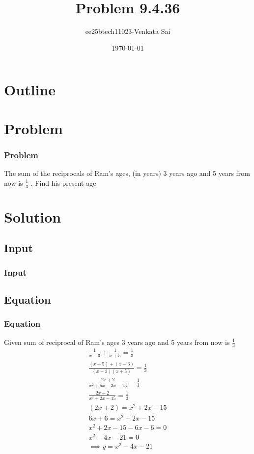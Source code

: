 \documentclass{beamer}
\title{Problem 9.4.36}
\author{ee25btech11023-Venkata Sai}
\date{\today}
\providecommand{\brak}[1]{\ensuremath{\left(#1\right)}}
\theoremstyle{remark}
\numberwithin{equation}{section}
\begin{document}
\begin{frame}
\titlepage
\end{frame}

\section*{Outline}
\begin{frame}
\tableofcontents
\end{frame}

\section{Problem}

\begin{frame}
\frametitle{Problem}
The sum of the reciprocals of Ram's ages, (in years) 3 years ago and 5 years from
now is $\frac{1}{3}$ . Find his present age
\end{frame}
\section{Solution}

\subsection{Input}
\setcounter{section}{1}
\begin{frame}
\frametitle{Input}
 
\end{frame}
\subsection{Equation}
\begin{frame}
\frametitle{Equation}
Given sum of reciprocal of Ram's ages 3 years ago and 5 years from
now is $\frac{1}{3}$
\begin{align}
\frac{1}{x-3}+\frac{1}{x+5}=\frac{1}{3} \\
\frac{\brak{x+5}+\brak{x-3}}{\brak{x-3}\brak{x+5}}=\frac{1}{3} \\
\frac{2x+2}{x^2+5x-3x-15}=\frac{1}{3}\\
\frac{2x+2}{x^2+2x-15}=\frac{1}{3}\\
\brak{2x+2}=x^2+2x-15\\
6x+6=x^2+2x-15 \\
x^2+2x-15-6x-6=0 \\
x^2-4x-21=0 \\
\implies y=x^2-4x-21
  \end{align}
\end{frame}
\end{document}
